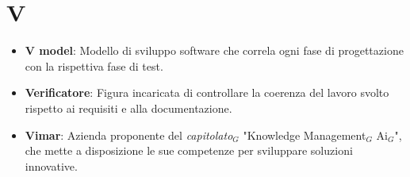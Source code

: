 \section{V}
\begin{itemize}
    \item \textbf{V model}: Modello di sviluppo software che correla ogni fase di progettazione con la rispettiva fase di test.
    \item \textbf{Verificatore}: Figura incaricata di controllare la coerenza del lavoro svolto rispetto ai requisiti e alla documentazione.
    \item \textbf{Vimar}: Azienda proponente del \textit{capitolato}$_G$ "Knowledge Management$_G$ Ai$_G$", che mette a disposizione le sue competenze per sviluppare soluzioni innovative.
\end{itemize}
